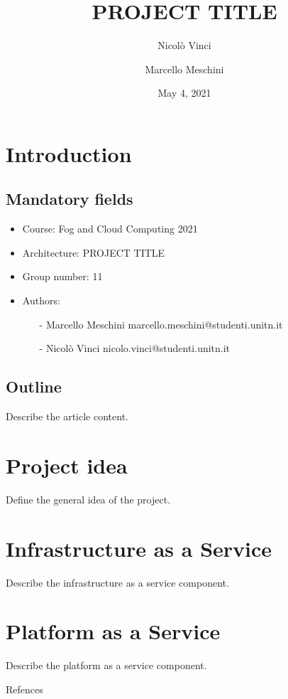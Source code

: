 \documentclass{article}
\title{PROJECT TITLE}
\author{Nicolò Vinci  \\
	\and 
	Marcello Meschini \\
	}
\date{May 4, 2021}
\begin{document}
\maketitle

\section{Introduction}
\label{intro}

\subsection{Mandatory fields}
\label{mfields}

\begin{itemize}
\item Course: Fog and Cloud Computing 2021
\item Architecture: PROJECT TITLE
\item Group number: 11
\item Authors:

\begin{itemize}
\item[-] Marcello Meschini marcello.meschini@studenti.unitn.it
\item[-] Nicolò Vinci nicolo.vinci@studenti.unitn.it
\end{itemize}

\end{itemize}

\subsection{Outline}
\label{outline}
Describe the article content. 



\section{Project idea} 
\label{idea}
Define the general idea of the project.

\section{Infrastructure as a Service}
\label{iass}
Describe the infrastructure as a service component.

\section{Platform as a Service}
\label{pass}
Describe the platform as a service component.

\begin{thebibliography}{9}
Refences
\end{thebibliography}
\end{document}
